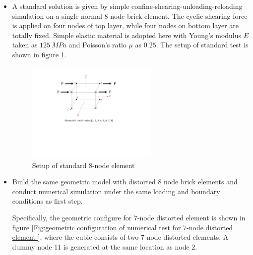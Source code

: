 \documentclass{article}
\begin{document}
\begin{itemize}
\item A standard solution is given by simple confine-shearing-unloading-reloading simulation on a single normal 8 node brick element.
%
The cyclic shearing force is applied on four nodes of top layer, while four nodes on bottom layer are totally fixed.
%
Simple elastic material is adopted here with Young's modulus $E$ taken as $125\ MPa$ and Poisson's ratio $\mu$ as $0.25$. 
%
The setup of standard test is shown in figure \ref{Fig:setup of standard 8-node element}. 
%
\begin{figure}[H]
\begin{center}
\includegraphics[width=0.6\textwidth]{images/standard_8_node_element.pdf}
\end{center}
\caption{\label{Fig:setup of standard 8-node element} Setup of standard 8-node element}
\end{figure}




%
\item Build the same geometric model with distorted 8 node brick elements and conduct numerical simulation under the same loading and boundary conditions as first step. 

Specifically, the geometric configure for 7-node distorted element is shown in figure \ref{Fig:geometric configuration of numerical test for 7-node distorted element }, where the cubic consists of two 7-node distorted elements. A dummy node 11 is generated at the same location as node 2. 


\end{itemize}
\end{document}
